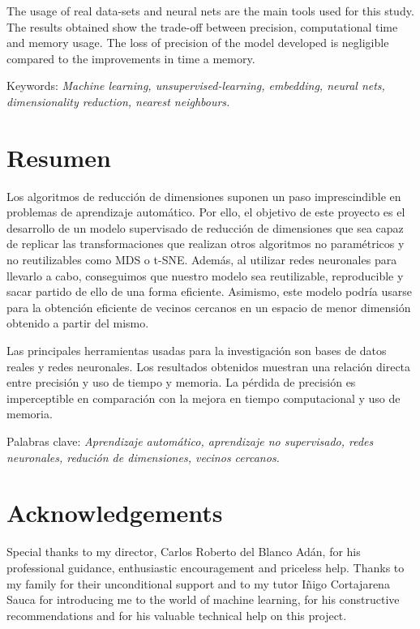\documentclass[a4paper,11pt,spanish]{report}
\begin{document}
The usage of real data-sets and neural nets are the main tools used for this study. The results obtained show the trade-off between precision, computational time and memory usage. The loss of precision of the model developed is negligible compared to the improvements in time a memory.

Keywords: \textit{Machine learning, unsupervised-learning, embedding, neural nets, dimensionality reduction, nearest neighbours.}

\chapter*{Resumen}

Los algoritmos de reducción de dimensiones suponen un paso imprescindible en problemas de aprendizaje automático. Por ello, el objetivo de este proyecto es el desarrollo de un modelo supervisado de reducción de dimensiones que sea capaz de replicar las transformaciones que realizan otros algoritmos no paramétricos y no reutilizables como MDS o t-SNE. Además, al utilizar redes neuronales para llevarlo a cabo, conseguimos que nuestro modelo sea reutilizable, reproducible y sacar partido de ello de una forma eficiente. Asimismo, este modelo podría usarse para la obtención eficiente de vecinos cercanos en un espacio de menor dimensión obtenido a partir del mismo.

Las principales herramientas usadas para la investigación son bases de datos reales y redes neuronales. Los resultados obtenidos muestran una relación directa entre precisión y uso de tiempo y memoria. La pérdida de precisión es imperceptible en comparación con la mejora en tiempo computacional y uso de memoria.

Palabras clave: \textit{Aprendizaje automático, aprendizaje no supervisado, redes neuronales, redución de dimensiones, vecinos cercanos.}

\chapter*{Acknowledgements}

Special thanks to my director, Carlos Roberto del Blanco Adán, for his professional guidance, enthusiastic encouragement and priceless help. Thanks to my family for their unconditional support and to my tutor Iñigo Cortajarena Sauca for introducing me to the world of machine learning, for his constructive recommendations and for his valuable technical help on this project.
\end{document}

